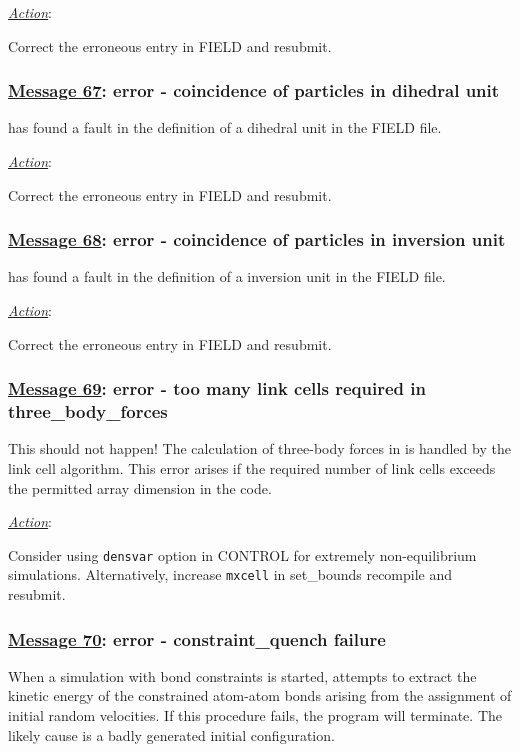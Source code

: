 \noindent \underline{\em Action}:

Correct the erroneous entry in FIELD and resubmit.

\subsubsection*{\underline{Message 67}: error - coincidence of particles in dihedral unit}

\D has found a fault in the definition of a dihedral unit in the
FIELD file.

\noindent \underline{\em Action}:

Correct the erroneous entry in FIELD and resubmit.

\subsubsection*{\underline{Message 68}: error - coincidence of particles in inversion unit}

\D has found a fault in the definition of a inversion unit in the
FIELD file.

\noindent \underline{\em Action}:

Correct the erroneous entry in FIELD and resubmit.

\subsubsection*{\underline{Message 69}: error - too many link cells required in three\_body\_forces}

This should not happen!  The calculation of three-body
forces in \D is handled by the link
cell algorithm.  This error arises if the required number of link
cells exceeds the permitted array dimension in the code.

\noindent \underline{\em Action}:

Consider using {\tt densvar} option in CONTROL for extremely
non-equilibrium simulations.  Alternatively, increase {\tt mxcell}
in {\sc set\_bounds} recompile and resubmit.

\subsubsection*{\underline{Message 70}: error - constraint\_quench failure}

When a simulation with bond constraints is
started, \D attempts to extract the kinetic energy of the
constrained atom-atom bonds arising from the assignment of initial
random velocities.  If this procedure fails, the program will
terminate.  The likely cause is a badly generated initial
configuration.

